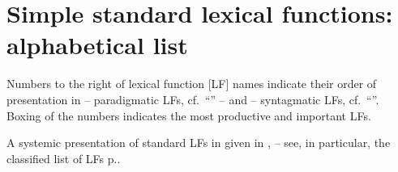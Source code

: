 

\chapter*{Simple standard lexical functions: alphabetical list}
\label{chap:listLFs}

Numbers to the right of lexical function [LF] names indicate their order of presentation in  -- paradigmatic LFs, cf.~``'' -- and  -- syntagmatic LFs, cf.~``''. Boxing of the numbers indicates the most productive and important LFs.

A systemic presentation of standard LFs in given in ,  -- see, in particular, the classified list of LFs p.\thinspace\pageref{tab:systFL}.

